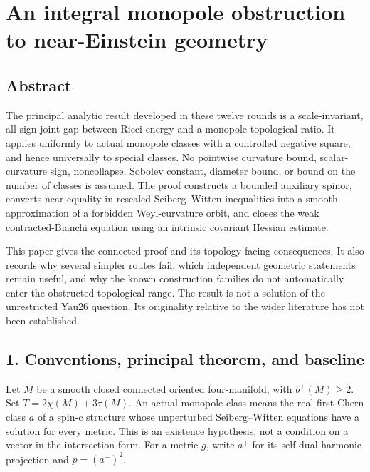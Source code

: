 \documentclass[
  english,
]{article}
\author{}
\date{}
\begin{document}
\hypertarget{an-integral-monopole-obstruction-to-near-einstein-geometry}{%
\section{An integral monopole obstruction to near-Einstein
geometry}\label{an-integral-monopole-obstruction-to-near-einstein-geometry}}

\hypertarget{abstract}{%
\subsection{Abstract}\label{abstract}}

The principal analytic result developed in these twelve rounds is a
scale-invariant, all-sign joint gap between Ricci energy and a monopole
topological ratio. It applies uniformly to actual monopole classes with
a controlled negative square, and hence universally to special classes.
No pointwise curvature bound, scalar-curvature sign, noncollapse,
Sobolev constant, diameter bound, or bound on the number of classes is
assumed. The proof constructs a bounded auxiliary spinor, converts
near-equality in rescaled Seiberg--Witten inequalities into a smooth
approximation of a forbidden Weyl-curvature orbit, and closes the weak
contracted-Bianchi equation using an intrinsic covariant Hessian
estimate.

This paper gives the connected proof and its topology-facing
consequences. It also records why several simpler routes fail, which
independent geometric statements remain useful, and why the known
construction families do not automatically enter the obstructed
topological range. The result is not a solution of the unrestricted
Yau26 question. Its originality relative to the wider literature has not
been established.

\hypertarget{conventions-principal-theorem-and-baseline}{%
\subsection{1. Conventions, principal theorem, and
baseline}\label{conventions-principal-theorem-and-baseline}}

Let \(M\) be a smooth closed connected oriented four-manifold, with
\(b^+(M)\ge2\). Set \(T=2\chi(M)+3\tau(M)\). An actual monopole class
means the real first Chern class \(a\) of a spin-c structure whose
unperturbed Seiberg--Witten equations have a solution for every metric.
This is an existence hypothesis, not a condition on a vector in the
intersection form. For a metric \(g\), write \(a^+\) for its self-dual
harmonic projection and \(p=(a^+)^2\).
\end{document}
